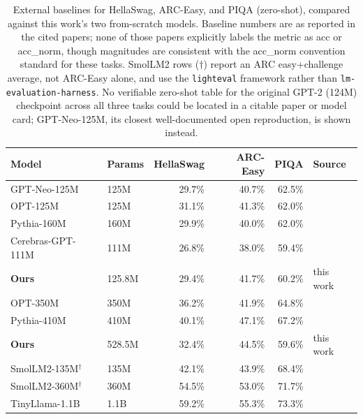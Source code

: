 \documentclass[11pt]{article}
\begin{document}
\begin{table}[h]
\centering
\caption{External baselines for HellaSwag, ARC-Easy, and PIQA (zero-shot),
compared against this work's two from-scratch models. Baseline numbers are
as reported in the cited papers; none of those papers explicitly labels the
metric as acc or acc\_norm, though magnitudes are consistent with the
acc\_norm convention standard for these tasks. SmolLM2 rows ($\dagger$)
report an ARC easy+challenge average, not ARC-Easy alone, and use the
\texttt{lighteval} framework rather than \texttt{lm-evaluation-harness}. No
verifiable zero-shot table for the original GPT-2 (124M) checkpoint across
all three tasks could be located in a citable paper or model card; GPT-Neo-125M,
its closest well-documented open reproduction, is shown instead.}
\label{tab:baselines}
\begin{tabular}{llrrrl}
\toprule
\textbf{Model} & \textbf{Params} & \textbf{HellaSwag} & \textbf{ARC-Easy} & \textbf{PIQA} & \textbf{Source} \\
\midrule
GPT-Neo-125M       & 125M   & 29.7\% & 40.7\% & 62.5\% & \citep{liu2024mobilellm} \\
OPT-125M           & 125M   & 31.1\% & 41.3\% & 62.0\% & \citep{liu2024mobilellm} \\
Pythia-160M        & 160M   & 29.9\% & 40.0\% & 62.0\% & \citep{liu2024mobilellm} \\
Cerebras-GPT-111M  & 111M   & 26.8\% & 38.0\% & 59.4\% & \citep{dey2023cerebrasgpt} \\
\textbf{Ours}      & 125.8M & 29.4\% & 41.7\% & 60.2\% & this work \\
\midrule
OPT-350M           & 350M   & 36.2\% & 41.9\% & 64.8\% & \citep{liu2024mobilellm} \\
Pythia-410M        & 410M   & 40.1\% & 47.1\% & 67.2\% & \citep{liu2024mobilellm} \\
\textbf{Ours}      & 528.5M & 32.4\% & 44.5\% & 59.6\% & this work \\
\midrule
SmolLM2-135M$^\dagger$ & 135M & 42.1\% & 43.9\% & 68.4\% & \citep{allal2025smollm2} \\
SmolLM2-360M$^\dagger$ & 360M & 54.5\% & 53.0\% & 71.7\% & \citep{allal2025smollm2} \\
TinyLlama-1.1B     & 1.1B   & 59.2\% & 55.3\% & 73.3\% & \citep{zhang2024tinyllama} \\
\bottomrule
\end{tabular}
\end{table}
\end{document}

